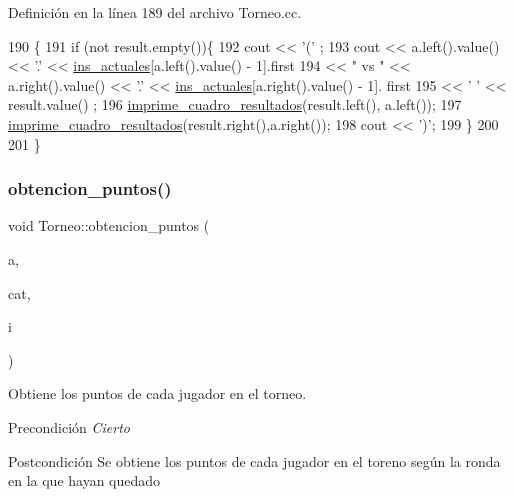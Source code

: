 Definición en la línea 189 del archivo Torneo.\+cc.


\begin{DoxyCode}
190 \{
191     \textcolor{keywordflow}{if} (not result.empty())\{
192         cout << \textcolor{charliteral}{'('} ;
193         cout << a.left().value() << \textcolor{charliteral}{'.'} << \hyperlink{class_torneo_a2293acd2d9d04bdefc603ab4cdce2c5a}{ins\_actuales}[a.left().value() - 1].first
194              << \textcolor{stringliteral}{" vs "} << a.right().value() << \textcolor{charliteral}{'.'} <<  \hyperlink{class_torneo_a2293acd2d9d04bdefc603ab4cdce2c5a}{ins\_actuales}[a.right().value() - 1].
      first
195              << \textcolor{charliteral}{' '} << result.value() ;
196         \hyperlink{class_torneo_aa42b2460bffdc5e1e85f7ebff4a5a6d0}{imprime\_cuadro\_resultados}(result.left(), a.left());
197         \hyperlink{class_torneo_aa42b2460bffdc5e1e85f7ebff4a5a6d0}{imprime\_cuadro\_resultados}(result.right(),a.right());
198         cout << \textcolor{charliteral}{')'};
199     \}
200 
201 \}
\end{DoxyCode}
\mbox{\label{class_torneo_a5ee0c8ca296bf422d040b05c768f7ba0}} 
\subsubsection{\texorpdfstring{obtencion\+\_\+puntos()}{obtencion\_puntos()}}
{\footnotesize\ttfamily void Torneo\+::obtencion\+\_\+puntos (\begin{DoxyParamCaption}\item[{const Bin\+Tree$<$ int $>$ \&}]{a,  }\item[{const \hyperlink{class_cjt__categorias}{Cjt\+\_\+categorias} \&}]{cat,  }\item[{int}]{i }\end{DoxyParamCaption})\hspace{0.3cm}{\ttfamily [private]}}



Obtiene los puntos de cada jugador en el torneo. 

\begin{DoxyPrecond}{Precondición}
{\itshape Cierto} 
\end{DoxyPrecond}
\begin{DoxyPostcond}{Postcondición}
Se obtiene los puntos de cada jugador en el toreno según la ronda en la que hayan quedado 
\end{DoxyPostcond}


